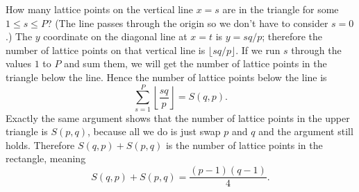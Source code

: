 \documentclass[a4paper]{article}
\newcommand{\floor}[1]{\lfloor#1\rfloor}
\newcommand{\bfloor}[1]{\left\lfloor#1\right\rfloor}
\begin{document}
\begin{enumerate}
		How many lattice points on the vertical line \(x=s\)
		are in the triangle for some \(1\le s\le P\)? 
		(The line passes through the origin so we don't have
		to consider \(s=0\).)
		The \(y\) coordinate on the diagonal line at \(x=t\)
		is \(y=sq/p\); therefore the number of lattice
		points on that vertical line is \(\floor{sq/p}.\)
		If we run \(s\) through the values \(1\) to \(P\) and sum
		them, we will get the number of lattice points
		in the triangle below the line. Hence the number
		of lattice points below the line is 
		\[\sum_{s=1}^{P}\bfloor{\frac{sq}{p}}=S(q,p).\]
		Exactly the same argument shows that the number of lattice
		points in the upper triangle is \(S(p,q)\), because
		all we do is just swap \(p\) and \(q\) and the argument
		still holds. Therefore \(S(q,p)+S(p,q)\) is the number
		of lattice points in the rectangle, meaning
		\[S(q,p)+S(p,q)=\frac{(p-1)(q-1)}{4}.\]
\end{enumerate}
\end{document}

